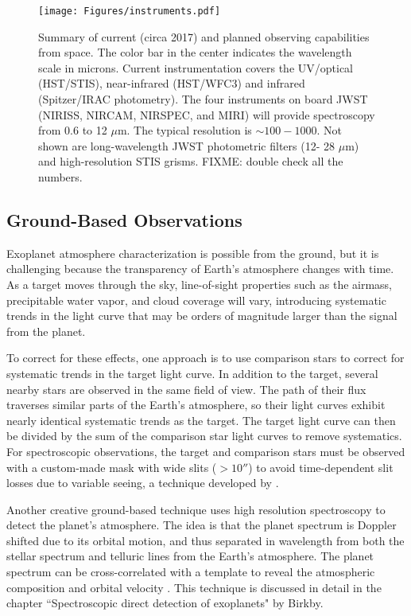 \documentclass[graybox,natbib,nosecnum]{svmult}
\begin{document}
\begin{figure}
\begin{centering}
\texttt{[image: Figures/instruments.pdf]}
\caption{Summary of current (circa 2017) and planned observing capabilities from space. The color bar in the center indicates the wavelength scale in microns. Current instrumentation covers the UV/optical (HST/STIS), near-infrared (HST/WFC3) and infrared (Spitzer/IRAC photometry). The four instruments on board JWST (NIRISS, NIRCAM, NIRSPEC, and MIRI) will provide spectroscopy from 0.6 to 12 $\mu$m. The typical resolution is $\sim100 - 1000$. Not shown are long-wavelength JWST photometric filters (12- 28 $\mu$m) and high-resolution STIS grisms. FIXME: double check all the numbers.}
\label{fig:instruments}       
\end{centering}
\end{figure}


\subsection{Ground-Based Observations}
Exoplanet atmosphere characterization is possible from the ground, but it is challenging because
the transparency of Earth's atmosphere changes with time.  As a target moves through the sky, line-of-sight properties such as the airmass, precipitable water vapor, and cloud coverage will vary, introducing systematic trends in the light curve that may be orders of magnitude larger than the signal from the planet. 

To correct for these effects, one approach is to use comparison stars to correct for systematic trends in the target light curve. In addition to the target, several nearby stars are observed in the same field of view. The path of their flux traverses similar parts of the Earth's atmosphere, so their light curves exhibit nearly identical systematic trends as the target. The target light curve can then be divided by the sum of the comparison star light curves to remove systematics.  For spectroscopic observations, the target and comparison stars must be observed with a custom-made mask with wide slits ($>10''$) to avoid time-dependent slit losses due to variable seeing, a technique developed by \cite{bean10}.

Another creative ground-based technique uses high resolution spectroscopy to detect the planet's atmosphere.  The idea is that the planet spectrum is Doppler shifted due to its orbital motion, and thus separated in wavelength from both the stellar spectrum and telluric lines from the Earth's atmosphere. The planet spectrum can be cross-correlated with a template to reveal the atmospheric composition and orbital velocity \citep[e.g.][]{snellen10}.  This technique is discussed in detail in the chapter ``Spectroscopic direct detection of exoplanets" by Birkby. 
\end{document}
